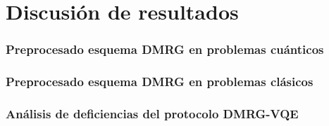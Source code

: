 \chapter{Discusión de resultados}

\subsection{Preprocesado esquema DMRG en problemas cuánticos}
\subsection{Preprocesado esquema DMRG en problemas clásicos}

\subsection{Análisis de deficiencias del protocolo DMRG-VQE}

